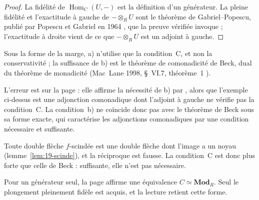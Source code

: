\begin{proof}
La fidélité de $\operatorname{Hom}_C(U, -)$ est la définition d'un générateur. La pleine fidélité et l'exactitude à gauche de $- \otimes_R U$ sont le théorème de Gabriel--Popescu, publié par Popescu et Gabriel en 1964 \cite{popescugabriel1964}, que la preuve vérifiée invoque ; l'exactitude à droite vient de ce que $- \otimes_R U$ est un adjoint à gauche.
\end{proof}

\begin{remarque}
Sous la forme de la marge, a) n'utilise que la condition~C, et non la conservativité ; la suffisance de b) est le théorème de comonadicité de Beck, dual du théorème de monadicité (Mac~Lane 1998, §~VI.7, théorème~1 \cite{maclane1998}).
\end{remarque}

\begin{remarque}
L'erreur est sur la page : elle affirme la nécessité de b) par , alors que l'exemple ci-dessus est une adjonction comonadique dont l'adjoint à gauche ne vérifie pas la condition~C. La condition~b) ne coïncide donc pas avec le théorème de Beck sous sa forme exacte, qui caractérise les adjonctions comonadiques par une condition nécessaire et suffisante.
\end{remarque}

\begin{remarque}
Toute double flèche $f$-scindée est une double flèche dont l'image a un noyau (lemme~\ref{lem:19-scinde}), et la réciproque est fausse. La condition~C est donc plus forte que celle de Beck : suffisante, elle n'est pas nécessaire.
\end{remarque}

\begin{remarque}
Pour un générateur seul, la page affirme une équivalence $C \simeq \mathbf{Mod}_R$. Seul le plongement pleinement fidèle est acquis, et la lecture retient cette forme.
\end{remarque}

